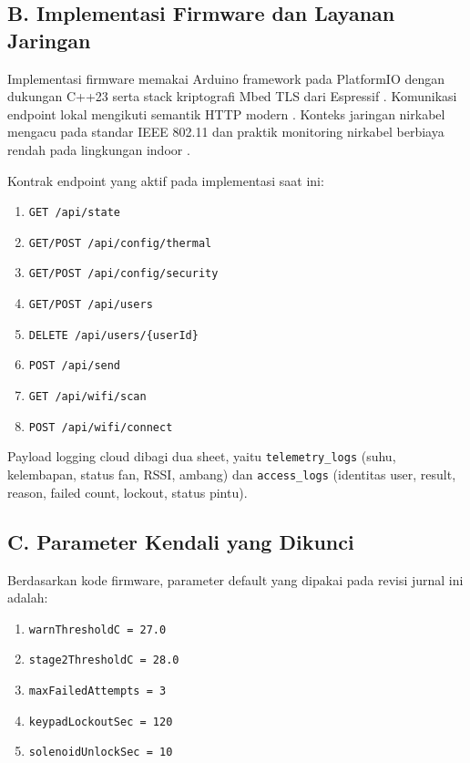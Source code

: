 \documentclass[10pt,a4paper,twocolumn]{article}
\begin{document}
\subsection*{B. Implementasi Firmware dan Layanan Jaringan}
Implementasi firmware memakai Arduino framework pada PlatformIO dengan dukungan C++23 serta stack kriptografi Mbed TLS dari Espressif \citep{espressif2025b,espressif2025a}. Komunikasi endpoint lokal mengikuti semantik HTTP modern \citep{rfc9110_2022}. Konteks jaringan nirkabel mengacu pada standar IEEE 802.11 dan praktik monitoring nirkabel berbiaya rendah pada lingkungan indoor \citep{ieee80211_2024,gul2024}.

Kontrak endpoint yang aktif pada implementasi saat ini:
\begin{enumerate}[leftmargin=*,nosep]
\item \texttt{GET /api/state}
\item \texttt{GET/POST /api/config/thermal}
\item \texttt{GET/POST /api/config/security}
\item \texttt{GET/POST /api/users}
\item \texttt{DELETE /api/users/\{userId\}}
\item \texttt{POST /api/send}
\item \texttt{GET /api/wifi/scan}
\item \texttt{POST /api/wifi/connect}
\end{enumerate}

Payload logging cloud dibagi dua sheet, yaitu \texttt{telemetry\_logs} (suhu, kelembapan, status fan, RSSI, ambang) dan \texttt{access\_logs} (identitas user, result, reason, failed count, lockout, status pintu).

\subsection*{C. Parameter Kendali yang Dikunci}
Berdasarkan kode firmware, parameter default yang dipakai pada revisi jurnal ini adalah:
\begin{enumerate}[leftmargin=*,nosep]
\item \texttt{warnThresholdC = 27.0}
\item \texttt{stage2ThresholdC = 28.0}
\item \texttt{maxFailedAttempts = 3}
\item \texttt{keypadLockoutSec = 120}
\item \texttt{solenoidUnlockSec = 10}
\end{enumerate}
\end{document}
